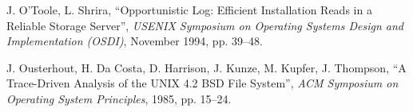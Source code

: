 \begin{thebibliography}{99}

J. O'Toole, L. Shrira,
``Opportunistic Log: Efficient Installation Reads in a Reliable Storage Server'',
{\it USENIX Symposium on Operating Systems Design and Implementation (OSDI)},
November 1994, pp. 39--48.


J. Ousterhout, H. Da Costa, D. Harrison, J. Kunze, M. Kupfer, J. Thompson,
``A Trace-Driven Analysis of the UNIX 4.2 BSD File System'',
{\it ACM Symposium on Operating System Principles},
1985, pp. 15--24.









\end{thebibliography}
